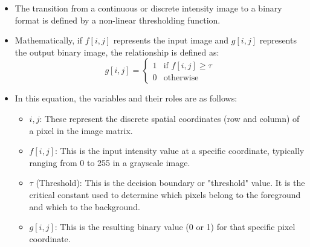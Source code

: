 \documentclass[12pt]{article}
\begin{document}
\begin{itemize}
    \item The transition from a continuous or discrete intensity image to a binary format is defined by a non-linear thresholding function.

    \item Mathematically, if $f[i,j]$ represents the input image and $g[i,j]$ represents the output binary image, the relationship is defined as:
          \[
              g[i, j] =
              \begin{cases}
                  1 & \text{if } f[i, j] \geq \tau \\
                  0 & \text{otherwise}
              \end{cases}
          \]

    \item In this equation, the variables and their roles are as follows:
          \begin{itemize}
              \item $i, j$: These represent the discrete spatial coordinates (row and column) of a pixel in the image matrix.
              \item $f[i, j]$: This is the input intensity value at a specific coordinate, typically ranging from 0 to 255 in a grayscale image.
              \item $\tau$ (Threshold): This is the decision boundary or "threshold" value. It is the critical constant used to determine which pixels belong to the foreground and which to the background.
              \item $g[i, j]$: This is the resulting binary value (0 or 1) for that specific pixel coordinate.
          \end{itemize}
\end{itemize}
\end{document}
